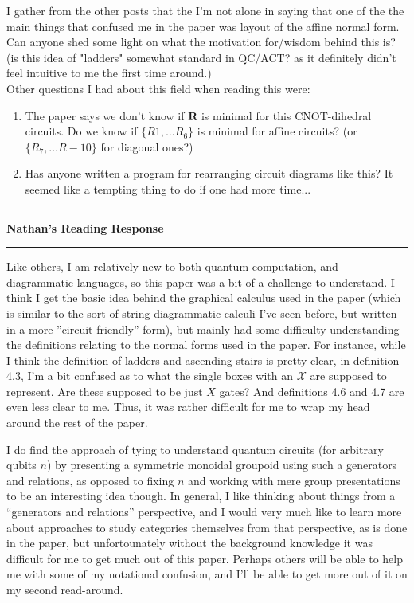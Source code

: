 \documentclass{amsart}
\newcommand{\iam}[1]{
  \vspace{0.25em}
  \hrule
  \vspace{0.25em}
  \textbf{{#1}'s Reading Response}
  \vspace{0.25em}
  \hrule
  \vspace{1em}
}
\begin{document}
I gather from the other posts that the I'm not alone in saying that one of the the main things that confused me in the paper was layout of the affine normal form. Can anyone shed some light on what the  motivation for/wisdom behind this is? (is this idea of "ladders" somewhat standard in QC/ACT? as it definitely didn't feel intuitive to me the first time around.)
\\
Other questions I had about this field when reading this were:
\begin{enumerate}
  \item The paper says we don't know if $\mathbf{R}$ is minimal for this CNOT-dihedral circuits. Do we know if $\{R1, \dots R_6\}$ is minimal for affine circuits? (or $\{R_7, \dots R-10\}$ for diagonal ones?)
  \item Has anyone written a program for rearranging circuit diagrams like this? It seemed like a tempting thing to do if one had more time...
\end{enumerate}

\iam{Nathan}

Like others, I am relatively new to both quantum computation, and diagrammatic languages, so this paper was a bit of a challenge to understand. I think I get the basic idea behind the graphical calculus used in the paper (which is similar to the sort of string-diagrammatic calculi I've seen before, but written in a more ''circuit-friendly'' form), but mainly had some difficulty understanding the definitions relating to the normal forms used in the paper. For instance, while I think the definition of ladders and ascending stairs is pretty clear, in definition 4.3, I'm a bit confused as to what the single boxes with an $\mathscr{X}$ are supposed to represent. Are these supposed to be just $X$ gates? And definitions 4.6 and 4.7 are even less clear to me. Thus, it was rather difficult for me to wrap my head around the rest of the paper.

I do find the approach of tying to understand quantum circuits (for arbitrary qubits $n$) by presenting a symmetric monoidal groupoid using such a generators and relations, as opposed to fixing $n$ and working with mere group presentations to be an interesting idea though. In general, I like thinking about things from a ``generators and relations'' perspective, and I would very much like to learn more about approaches to study categories themselves from that perspective, as is done in the paper, but unfortounately without the background knowledge it was difficult for me to get much out of this paper. Perhaps others will be able to help me with some of my notational confusion, and I'll be able to get more out of it on my second read-around.
\end{document}

